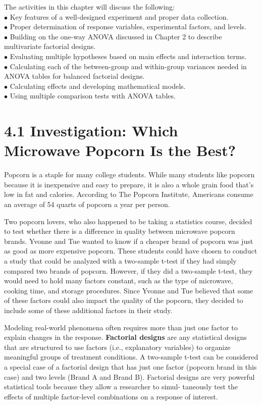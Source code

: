 \documentclass[
]{report}
\begin{document}
The activities in this chapter will discuss the following:\\
\(\bullet\) Key features of a well-designed experiment and proper data collection.\\
\(\bullet\) Proper determination of response variables, experimental factors, and levels.\\
\(\bullet\) Building on the one-way ANOVA discussed in Chapter 2 to describe multivariate factorial designs.\\
\(\bullet\) Evaluating multiple hypotheses based on main effects and interaction terms.\\
\(\bullet\) Calculating each of the between-group and within-group variances needed in ANOVA tables for balanced factorial designs.\\
\(\bullet\) Calculating effects and developing mathematical models.\\
\(\bullet\) Using multiple comparison tests with ANOVA tables.

\chapter{4.1 Investigation: Which Microwave Popcorn Is the Best?}\label{investigation-which-microwave-popcorn-is-the-best}

Popcorn is a staple for many college students. While many students like popcorn because it is inexpensive
and easy to prepare, it is also a whole grain food that's low in fat and calories. According to The Popcorn
Institute, Americans consume an average of 54 quarts of popcorn a year per person.

Two popcorn lovers, who also happened to be taking a statistics course, decided to test whether there is a
difference in quality between microwave popcorn brands. Yvonne and Tue wanted to know if a cheaper brand
of popcorn was just as good as more expensive popcorn. These students could have chosen to conduct a study
that could be analyzed with a two-sample t-test if they had simply compared two brands of popcorn. However,
if they did a two-sample t-test, they would need to hold many factors constant, such as the type of microwave,
cooking time, and storage procedures. Since Yvonne and Tue believed that some of these factors could also
impact the quality of the popcorn, they decided to include some of these additional factors in their study.

Modeling real-world phenomena often requires more than just one factor to explain changes in the
response. \textbf{Factorial designs} are any statistical designs that are structured to use factors (i.e., explanatory
variables) to organize meaningful groups of treatment conditions. A two-sample t-test can be considered a
special case of a factorial design that has just one factor (popcorn brand in this case) and two levels (Brand A
and Brand B). Factorial designs are very powerful statistical tools because they allow a researcher to simul-
taneously test the effects of multiple factor-level combinations on a response of interest.
\end{document}
